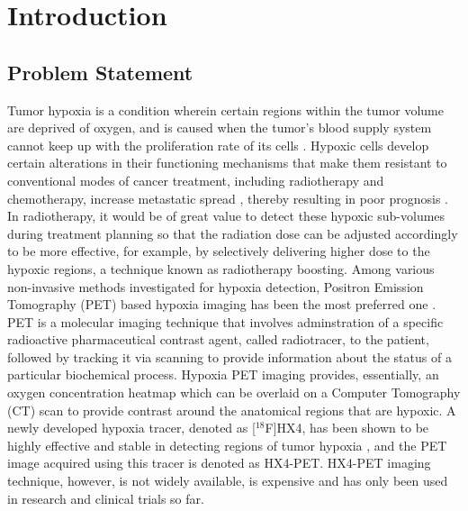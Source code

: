\chapter{Introduction}
\label{Introduction}

\section{Problem Statement}
Tumor hypoxia is a condition wherein certain regions within the tumor volume are deprived of oxygen, and is caused when the tumor's blood supply system cannot keep up with the proliferation rate of its cells \cite{hockel2001tumor}. Hypoxic cells develop certain alterations in their functioning mechanisms that make them resistant to conventional modes of cancer treatment, including radiotherapy and chemotherapy, increase metastatic spread \cite{muz2015role}, thereby resulting in poor prognosis \cite{vaupel2007hypoxia}. In radiotherapy, it would be of great value to detect these hypoxic sub-volumes during treatment planning so that the radiation dose can be adjusted accordingly to be more effective, for example, by selectively delivering higher dose to the hypoxic regions, a technique known as radiotherapy boosting. Among various non-invasive methods investigated for hypoxia detection, Positron Emission Tomography (PET) based hypoxia imaging has been the most preferred one \cite{fleming2015imaging}. PET is a molecular imaging technique that involves adminstration of a specific radioactive pharmaceutical contrast agent, called radiotracer, to the patient, followed by tracking it via scanning to provide information about the status of a particular biochemical process. Hypoxia PET imaging provides, essentially, an oxygen concentration heatmap which can be overlaid on a Computer Tomography (CT) scan to provide contrast around the anatomical regions that are hypoxic. A newly developed hypoxia tracer, denoted as [$^{18}$F]HX4, has been shown to be highly effective and stable in detecting regions of tumor hypoxia \cite{sanduleanu2020hypoxia}, and the PET image acquired using this tracer is denoted as HX4-PET. HX4-PET imaging technique, however, is not widely available, is expensive and has only been used in research and clinical trials so far. 

